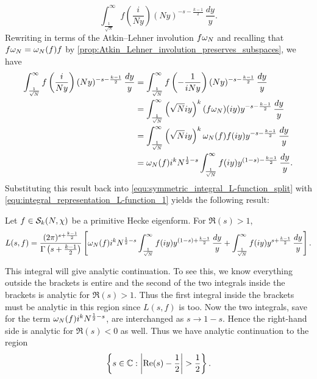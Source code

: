       \[
        \int_{\frac{1}{\sqrt{N}}}^{\infty}f\left(\frac{i}{Ny}\right)(Ny)^{-s-\frac{k-1}{2}}\,\frac{dy}{y}.
      \]
      Rewriting in terms of the Atkin–Lehner involution $f\omega_{N}$ and recalling that $f\omega_{N} = \omega_{N}(f)f$ by \cref{prop:Atkin_Lehner_involution_preserves_subspaces}, we have
      \begin{align*}
        \int_{\frac{1}{\sqrt{N}}}^{\infty}f\left(\frac{i}{Ny}\right)(Ny)^{-s-\frac{k-1}{2}}\,\frac{dy}{y} &= \int_{\frac{1}{\sqrt{N}}}^{\infty}f\left(-\frac{1}{iNy}\right)(Ny)^{-s-\frac{k-1}{2}}\,\frac{dy}{y} \\
        &= \int_{\frac{1}{\sqrt{N}}}^{\infty}\left(\sqrt{N}iy\right)^{k}(f\omega_{N})(iy)y^{-s-\frac{k-1}{2}}\,\frac{dy}{y} \\
        &= \int_{\frac{1}{\sqrt{N}}}^{\infty}\left(\sqrt{N}iy\right)^{k}\omega_{N}(f)f(iy)y^{-s-\frac{k-1}{2}}\,\frac{dy}{y} \\
        &= \omega_{N}(f)i^{k}N^{\frac{1}{2}-s}\int_{\frac{1}{\sqrt{N}}}^{\infty}f(iy)y^{(1-s)-\frac{k-1}{2}}\,\frac{dy}{y}.
      \end{align*}
      Substituting this result back into \cref{equ:symmetric_integral_L-function_split} with \cref{equ:integral_representation_L-function_1} yields the following result:
      \begin{theorem}
        Let $f \in \mathcal{S}_{k}(N,\chi)$ be a primitive Hecke eigenform. For $\Re(s) > 1$,
        \[
          L(s,f) = \frac{(2\pi)^{s+\frac{k-1}{2}}}{\Gamma\left(s+\frac{k-1}{2}\right)}\left[\omega_{N}(f)i^{k}N^{\frac{1}{2}-s}\int_{\frac{1}{\sqrt{N}}}^{\infty}f(iy)y^{(1-s)+\frac{k-1}{2}}\,\frac{dy}{y}+\int_{\frac{1}{\sqrt{N}}}^{\infty}f(iy)y^{s+\frac{k-1}{2}}\,\frac{dy}{y}\right].
        \]
      \end{theorem}

      This integral will give analytic continuation. To see this, we know everything outside the brackets is entire and the second of the two integrals inside the brackets is analytic for $\Re(s) > 1$. Thus the first integral inside the brackets must be analytic in this region since $L(s,f)$ is too. Now the two integrals, save for the term $\omega_{N}(f)i^{k}N^{\frac{1}{2}-s}$, are interchanged as $s \to 1-s$. Hence the right-hand side is analytic for $\Re(s) < 0$ as well. Thus we have analytic continuation to the region
      \[
        \left\{s \in \mathbb{C}:\left|\mathrm{Re}(s)-\frac{1}{2}\right| > \frac{1}{2}\right\}.
      \]
